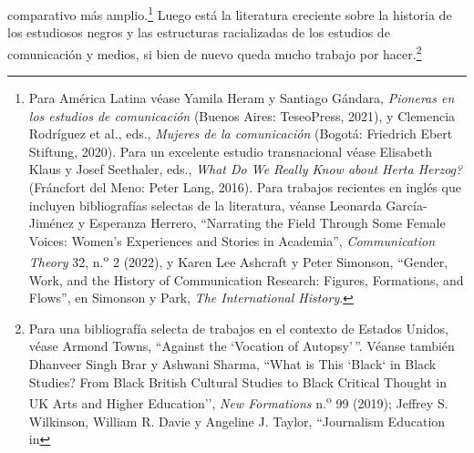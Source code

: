 \documentclass{tufte-handout}
\begin{document}
comparativo más amplio.\footnote{Para América Latina véase Yamila Heram
  y Santiago Gándara, \emph{Pioneras en los estudios de comunicación}
  (Buenos Aires: TeseoPress, 2021), y Clemencia Rodríguez et al., eds.,
  \emph{Mujeres de la comunicación} (Bogotá: Friedrich Ebert Stiftung,
  2020). Para un excelente estudio transnacional véase Elisabeth Klaus y
  Josef Seethaler, eds., \emph{What Do We Really Know about Herta
  Herzog?} (Fráncfort del Meno: Peter Lang, 2016). Para trabajos
  recientes en inglés que incluyen bibliografías selectas de la
  literatura, véanse Leonarda García-Jiménez y Esperanza Herrero,
  ``Narrating the Field Through Some Female Voices: Women's Experiences
  and Stories in Academia'', \emph{Communication Theory} 32,
  n.\textsuperscript{o} 2 (2022), y Karen Lee Ashcraft y Peter Simonson,
  ``Gender, Work, and the History of Communication Research: Figures,
  Formations, and Flows'', en Simonson y Park, \emph{The International
  History}.} Luego está la literatura creciente sobre la historia de los
estudiosos negros y las estructuras racializadas de los estudios de
comunicación y medios, si bien de nuevo queda mucho trabajo por
hacer.\footnote{Para una bibliografía selecta de trabajos en el contexto
  de Estados Unidos, véase Armond Towns, ``Against the `Vocation of
  Autopsy'\,''. Véanse también Dhanveer Singh Brar y Ashwani Sharma,
  ``What is This `Black` in Black Studies? From Black British Cultural
  Studies to Black Critical Thought in UK Arts and Higher Education'',
  \emph{New Formations} n.\textsuperscript{o} 99 (2019); Jeffrey S.
  Wilkinson, William R. Davie y Angeline J. Taylor, ``Journalism
  Education in}
\end{document}
